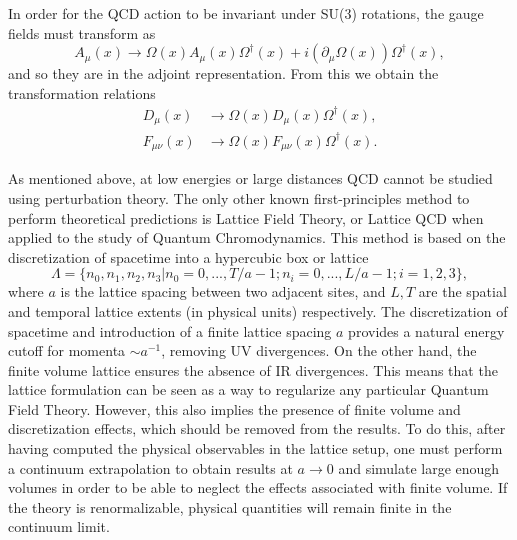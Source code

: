 In order for the QCD action to be invariant under SU(3) rotations, the gauge fields must transform as
\begin{equation}
A_{\mu}(x)\to\Omega(x)A_{\mu}(x)\Omega^{\dagger}(x)+i\left(\partial_{\mu}\Omega(x)\right)\Omega^{\dagger}(x),
\end{equation}
and so they are in the adjoint representation. From this we obtain the transformation relations
\begin{align}
D_{\mu}(x)&\to\Omega(x)D_{\mu}(x)\Omega^{\dagger}(x), \\
F_{\mu\nu}(x)&\to\Omega(x)F_{\mu\nu}(x)\Omega^{\dagger}(x).
\end{align}

As mentioned above, at low energies or large distances QCD cannot be studied using perturbation theory. The only other known first-principles method to perform theoretical predictions is Lattice Field Theory, or Lattice QCD when applied to the study of Quantum Chromodynamics. This method is based on the discretization of spacetime into a hypercubic box or lattice
\begin{equation}
\Lambda=\{n_0,n_1,n_2,n_3|n_0=0,...,T/a-1;n_i=0,...,L/a-1;i=1,2,3\},
\end{equation} 
where $a$ is the lattice spacing between two adjacent sites, and $L,T$ are the spatial and temporal lattice extents (in physical units) respectively. The discretization of spacetime and introduction of a finite lattice spacing $a$ provides a natural energy cutoff for momenta $\sim a^{-1}$, removing UV divergences. On the other hand, the finite volume lattice ensures the absence of IR divergences. This means that the lattice formulation can be seen as a way to regularize any particular Quantum Field Theory. However, this also implies the presence of finite volume and discretization effects, which should be removed from the results. To do this, after having computed the physical observables in the lattice setup, one must perform a continuum extrapolation to obtain results at $a\rightarrow0$ and simulate large enough volumes in order to be able to neglect the effects associated with finite volume. If the theory is renormalizable, physical quantities will remain finite in the continuum limit.

